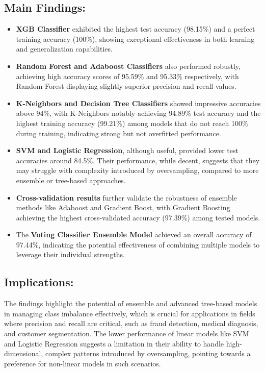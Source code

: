 \documentclass[a4paper,num-refs,gigabyte]{oup-contemporary}
\begin{document}
\subsection*{Main Findings:}
\begin{itemize}
    \item \textbf{XGB Classifier} exhibited the highest test accuracy (98.15\%) and a perfect training accuracy (100\%), showing exceptional effectiveness in both learning and generalization capabilities.
    \item \textbf{Random Forest and Adaboost Classifiers} also performed robustly, achieving high accuracy scores of 95.59\% and 95.33\% respectively, with Random Forest displaying slightly superior precision and recall values.
    \item \textbf{K-Neighbors and Decision Tree Classifiers} showed impressive accuracies above 94\%, with K-Neighbors notably achieving 94.89\% test accuracy and the highest training accuracy (99.21\%) among models that do not reach 100\% during training, indicating strong but not overfitted performance.
    \item \textbf{SVM and Logistic Regression}, although useful, provided lower test accuracies around 84.5\%. Their performance, while decent, suggests that they may struggle with complexity introduced by oversampling, compared to more ensemble or tree-based approaches.
    \item \textbf{Cross-validation results} further validate the robustness of ensemble methods like Adaboost and Gradient Boost, with Gradient Boosting achieving the highest cross-validated accuracy (97.39\%) among tested models.
    \item The \textbf{Voting Classifier Ensemble Model} achieved an overall accuracy of 97.44\%, indicating the potential effectiveness of combining multiple models to leverage their individual strengths.
\end{itemize}

\subsection*{Implications:}
The findings highlight the potential of ensemble and advanced tree-based models in managing class imbalance effectively, which is crucial for applications in fields where precision and recall are critical, such as fraud detection, medical diagnosis, and customer segmentation.
The lower performance of linear models like SVM and Logistic Regression suggests a limitation in their ability to handle high-dimensional, complex patterns introduced by oversampling, pointing towards a preference for non-linear models in such scenarios.
\end{document}
